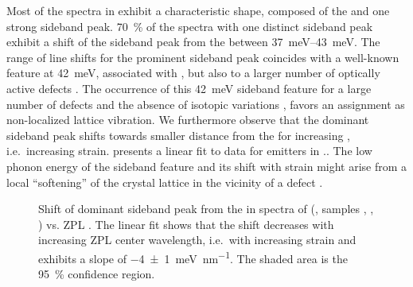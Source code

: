 		Most of the spectra in \vl exhibit a characteristic shape, composed of the \ZPL and one strong sideband peak.
		\SI{70}{\percent} of the \pl spectra with one distinct sideband peak exhibit a shift of the sideband peak from the \ZPL between \SIrange{37}{43}{meV}.
		The range of line shifts for the prominent sideband peak coincides with a well-known feature at \SI{42}{meV}, associated with \sivs \cite{Larkins1971,Sternschulte1994}, but also to a larger number of optically active defects \cite{Sternschulte1994}.
		The occurrence of this \SI{42}{meV} sideband feature for a large number of defects and the absence of isotopic variations \cite{Dietrich2014}, favors an assignment as non-localized lattice vibration.
		We furthermore observe that the dominant sideband peak shifts towards smaller distance from the \ZPL for increasing \ZPL \cwl, i.e.\ increasing strain.  presents a linear fit to data for emitters in \vl..
		The low phonon energy of the sideband feature and its shift with strain might arise from a local ``softening'' of the crystal lattice in the vicinity of a defect \cite{Sternschulte1994}.

		\begin{figure}[!htb]
			\centering
			\caption[Shift of dominant side band peaks for \sivs]{Shift of dominant sideband peak from the \ZPL in spectra of \sivs (\vl, samples \insituF, \insituS, \insituH) vs. ZPL \cwl. The linear fit shows that the shift decreases with increasing ZPL center wavelength, i.e.\ with increasing strain and exhibits a slope of \SI[separate-uncertainty]{-4\pm1}{\milli\electronvolt\per\nano\meter}. The shaded area is the \SI{95}{\percent} confidence region.}
			\label{fig::sideband_fit}
		\end{figure}

